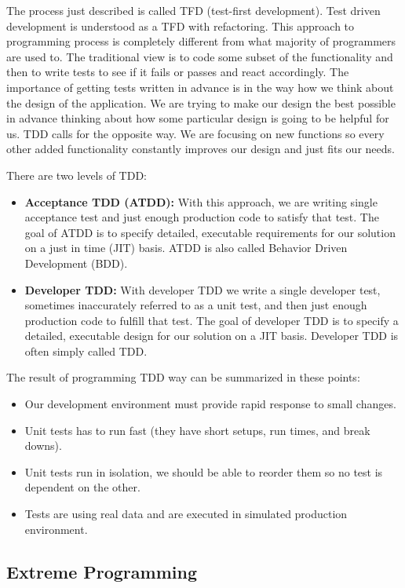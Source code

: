 \documentclass[12pt,final,oneside]{fithesis}
\begin{document}
The process just described is called TFD (test-first development). Test driven development is understood as a TFD with refactoring. This approach to programming process is completely different from what majority of programmers are used to. The traditional view is to code some subset of the functionality and then to write tests to see if it fails or passes and react accordingly. The importance of getting tests written in advance is in the way how we think about the design of the application. We are trying to make our design the best possible in advance thinking about how some particular design is going to be helpful for us. TDD calls for the opposite way. We are focusing on new functions so every other added functionality constantly improves our design and just fits our needs.

\newpage
There are two levels of TDD:

\begin{itemize}
	\item{\textbf{Acceptance TDD (ATDD):}} With this approach, we are writing single acceptance test and just enough production code to satisfy that test. The goal of ATDD is to specify detailed, executable requirements for our solution on a just in time (JIT) basis. ATDD is also called Behavior Driven Development (BDD).
	\item{\textbf{Developer TDD:}} With developer TDD we write a single developer test, sometimes inaccurately referred to as a unit test, and then just enough production code to fulfill that test. The goal of developer TDD is to specify a detailed, executable design for our solution on a JIT basis.  Developer TDD is often simply called TDD.
\end{itemize}

The result of programming TDD way can be summarized in these points:

\begin{itemize}
	\item{Our development environment must provide rapid response to small changes.}
	\item{Unit tests has to run fast (they have short setups, run times, and break downs).}
	\item{Unit tests run in isolation, we should be able to reorder them so no test is dependent on the other.}
	\item{Tests are using real data and are executed in simulated production environment.}
\end{itemize}	

	\subsection{Extreme Programming}
	
\end{document}
